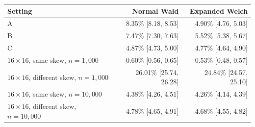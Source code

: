 \begin{tabularx}{\textwidth}{@{}>{\raggedright\arraybackslash}Xrr@{}}
\toprule
Setting & Normal Wald & Expanded Welch\\
\midrule
A & 8.35\% [8.18, 8.53] & 4.90\% [4.76, 5.03]\\
B & 7.47\% [7.30, 7.63] & 5.52\% [5.38, 5.67]\\
C & 4.87\% [4.73, 5.00] & 4.77\% [4.64, 4.90]\\
\(16\times16\), same skew, \(n=1{,}000\) & 0.60\% [0.56, 0.65] & 0.53\% [0.48, 0.57]\\
\(16\times16\), different skew, \(n=1{,}000\) & 26.01\% [25.74, 26.28] & 24.84\% [24.57, 25.10]\\
\midrule
\(16\times16\), same skew, \(n=10{,}000\) & 4.38\% [4.26, 4.51] & 4.26\% [4.14, 4.39]\\
\(16\times16\), different skew, \(n=10{,}000\) & 4.78\% [4.65, 4.91] & 4.68\% [4.55, 4.82]\\
\bottomrule
\end{tabularx}
